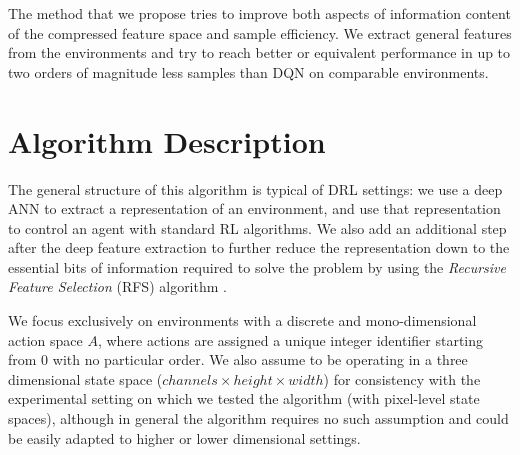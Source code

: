 The method that we propose tries to improve both aspects of information content
of the compressed feature space and sample efficiency. We extract general 
features from the environments and try to reach better or equivalent performance
in up to two orders of magnitude less samples than DQN on comparable 
environments.

\section{Algorithm Description}
The general structure of this algorithm is typical of DRL settings: we use a 
deep ANN to extract a representation of an environment, and use that 
representation to control an agent with standard RL algorithms. We also add an 
additional step after the deep feature extraction to further reduce the 
representation down to the essential bits of information required to solve the 
problem by using the \textit{Recursive Feature Selection} (RFS) algorithm 
\cite{castelletti2011tree}.

We focus exclusively on environments with a discrete and mono-dimensional 
action space $A$, where actions are assigned a unique integer identifier 
starting from $0$ with no particular order. 
We also assume to be operating in a three dimensional state space 
($channels \times height \times width$) for consistency with the experimental 
setting on which we tested the algorithm (with pixel-level state spaces), 
although in general the algorithm requires no such assumption and could be 
easily adapted to higher or lower dimensional settings. 

